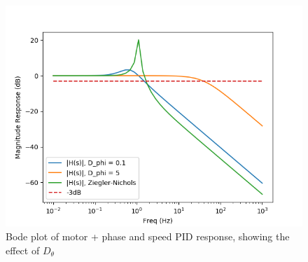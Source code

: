\documentclass[11pt]{article} %
\begin{document}
\begin{figure}
\centering
\includegraphics[scale=0.75]{ClosedLoopBodePlot.png}
\caption{Bode plot of motor + phase and speed PID response, showing the effect of $D_\theta$}
\label{fig:Bode}
\end{figure}
\end{document}
